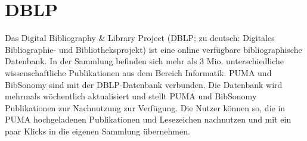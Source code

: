 \section{DBLP}
\label{dblp}
Das Digital Bibliography \& Library Project (DBLP; zu deutsch: Digitales Bibliographie- und Bibliotheksprojekt) ist eine online verfügbare bibliographische Datenbank. In der Sammlung befinden sich mehr als 3 Mio. unterschiedliche wissenschaftliche Publikationen aus dem Bereich Informatik.\newline
PUMA und BibSonomy sind mit der DBLP-Datenbank verbunden. Die Datenbank wird mehrmals wöchentlich aktualisiert und stellt PUMA und BibSonomy Publikationen zur Nachnutzung zur Verfügung. \newline
Die Nutzer können so, die in PUMA hochgeladenen Publikationen und Lesezeichen nachnutzen und mit ein paar Klicks in die eigenen Sammlung übernehmen. 
